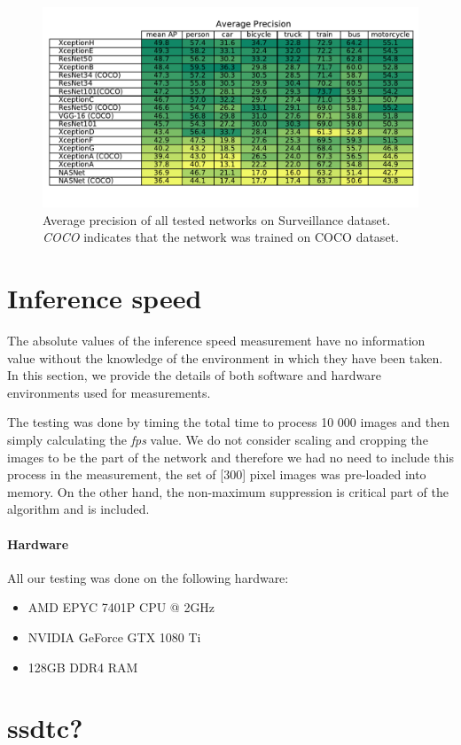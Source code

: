 \begin{figure}
    \centering
    \includegraphics[width=\textwidth]{img/ap}
    \caption[Average precision of all tested networks on Surveillance dataset]{Average precision of all tested networks on Surveillance dataset. \textit{COCO} indicates that the network was trained on COCO dataset.} 
    \label{fig:ap}
\end{figure}

\section{Inference speed}
The absolute values of the inference speed measurement have no information value without the knowledge of the environment in which they have been taken. In this section, we provide the details of both software and hardware environments used for measurements.

The testing was done by timing the total time to process 10 000 images and then simply calculating the \textit{fps} value. We do not consider scaling and cropping the images to be the part of the network and therefore we had no need to include this process in the measurement, the set of [300] pixel images was pre-loaded into memory. On the other hand, the non-maximum suppression is critical part of the algorithm and is included. 

\paragraph{Hardware} All our testing was done on the following hardware:
\begin{itemize}
    \item AMD EPYC 7401P CPU @ 2GHz 
    \item NVIDIA GeForce GTX 1080 Ti
    \item 128GB DDR4 RAM
\end{itemize}

\section{ssdtc?}